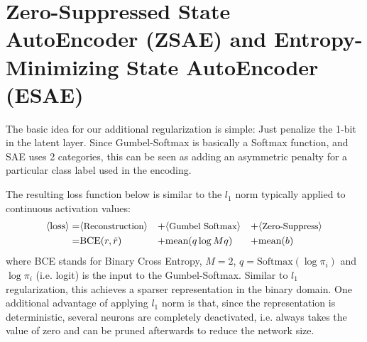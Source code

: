 \section{Zero-Suppressed State AutoEncoder (ZSAE) and Entropy-Minimizing State AutoEncoder (ESAE)}
\label{zsae}

The basic idea for our additional regularization is simple: Just penalize the
1-bit in the latent layer. Since Gumbel-Softmax is basically a Softmax function,
and SAE uses 2 categories, this can be seen as adding an
asymmetric penalty for a particular class label used in the encoding.

The resulting loss function below is similar to the $l_1$ norm typically
applied to continuous activation values:
\begin{align*}
 \brackets{\text{loss}} = & \brackets{\text{\small Reconstruction}} &+ & \brackets{\text{\small Gumbel Softmax}} &+ & \brackets{\text{\small Zero-Suppress}} \\ 
 =                        & \text{BCE}(r,\tilde{r})     &+ & \text{mean}(q \log Mq)           &+ & \text{mean}(b)                  
\end{align*}
where BCE stands for Binary Cross Entropy,
$M=2$, $q=\text{Softmax}(\log \pi_i)$ and $\log \pi_i$ (i.e. logit) is the input to the Gumbel-Softmax.
Similar to $l_1$ regularization, this achieves a sparser representation in the binary domain.
One additional advantage of applying $l_1$ norm is that, since the representation is deterministic,
several neurons are completely deactivated, i.e. always takes the value of zero
and can be pruned afterwards to reduce the network size.

